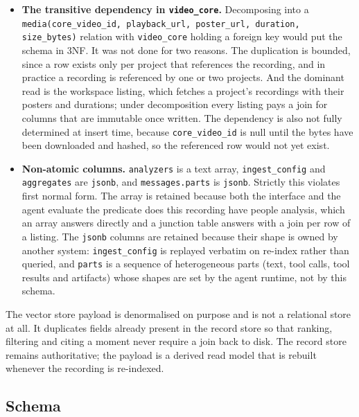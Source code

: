 \documentclass[11pt,a4paper]{article}
\begin{document}
\begin{itemize}
  \item \textbf{The transitive dependency in \texttt{video\_core}.} Decomposing
        into a \texttt{media(core\_video\_id, playback\_url, poster\_url,
        duration, size\_bytes)} relation with \texttt{video\_core} holding a
        foreign key would put the schema in 3NF. It was not done for two
        reasons. The duplication is bounded, since a row exists only per project
        that references the recording, and in practice a recording is referenced
        by one or two projects. And the dominant read is the workspace listing,
        which fetches a project's recordings with their posters and durations;
        under decomposition every listing pays a join for columns that are
        immutable once written. The dependency is also not fully determined at
        insert time, because \texttt{core\_video\_id} is null until the bytes
        have been downloaded and hashed, so the referenced row would not yet
        exist.
  \item \textbf{Non-atomic columns.} \texttt{analyzers} is a text array,
        \texttt{ingest\_config} and \texttt{aggregates} are \texttt{jsonb}, and
        \texttt{messages.parts} is \texttt{jsonb}. Strictly this violates first
        normal form. The array is retained because both the interface and the
        agent evaluate the predicate does this recording have people analysis,
        which an array answers directly and a junction table answers with a
        join per row of a listing. The \texttt{jsonb} columns are retained
        because their shape is owned by another system: \texttt{ingest\_config}
        is replayed verbatim on re-index rather than queried, and
        \texttt{parts} is a sequence of heterogeneous parts (text, tool calls,
        tool results and artifacts) whose shapes are set by the agent runtime,
        not by this schema.
\end{itemize}

The vector store payload is denormalised on purpose and is not a relational
store at all. It duplicates fields already present in the record store so that
ranking, filtering and citing a moment never require a join back to disk. The
record store remains authoritative; the payload is a derived read model that is
rebuilt whenever the recording is re-indexed.

\subsection{Schema}
\end{document}
